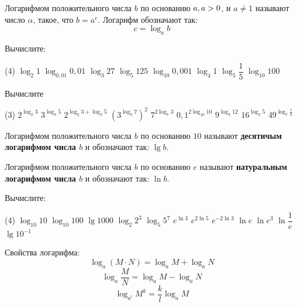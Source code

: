 \begin{class}[number=5]
	\begin{definit}
		Логарифмом положительного числа \(b\) по основанию \(a, \\ a>0 \), и \(a \neq 1\) называют число \( \alpha \), такое, что \(b=a^{c}\). Логарифм обозначают так: \[ c = \log_a b \]
	\end{definit}
	\begin{listofex}
		\item Вычислите:
		\begin{tasks}(4)
			\task \( \log_2 1 \)
			\task \( \log_{0,01} 0,01 \)
			\task \( \log_3 27 \)
			\task \( \log_5 125 \)
			\task \( \log_{10} 0,001 \)
			\task \( \log_4 1 \)
			\task \( \log_5 \dfrac{1}{5} \)
			\task \( \log_{10} 100 \)
		\end{tasks}
		\item Вычислите
		\begin{tasks}(3)
			\task \( 2^{\log_2 3} \)
			\task \( 3^{\log_3 5} \)
			\task \( 2^{\log_2 3 + \log_2 5} \)
			\task \( ( 3^{\log_3 7} )^2 \)
			\task \( 7^{2\log_7 3} \)
			\task \( 0,1^{2\log_{10} 10}  \)
			\task \( 9^{\log_3 12} \)
			\task \( 16^{\log_2 5} \)
			\task \( 49^{\log_7 \frac{1}{3}} \)
		\end{tasks}
	\end{listofex}
	\begin{definit}
		Логарифмом положительного числа \(b\) по основанию \(10\) называют \textbf{десятичым логарифмом числа \(b\)} и обозначают так: \( \lg b \).
	\end{definit}
	\begin{definit}
		Логарифмом положительного числа \(b\) по основанию \(e\) называют \textbf{натуральным логарифмом числа \(b\)} и обозначают так: \( \ln b \).
	\end{definit}
	\begin{listofex}[resume]
		\item Вычислите:
		\begin{tasks}(4)
			\task \( \log_{10} 10 \)
			\task \( \log_{10} 100 \)
			\task \( \lg 1000 \)
			\task \( \log_2 2^3 \)
			\task \( \log_5 5^7 \)
			\task \( e^{\ln 3} \)
			\task \( e^{2\ln 5} \)
			\task \( e^{-2\ln 3} \)
			\task \( \ln e \)
			\task \( \ln e^3 \)
			\task \( \ln \dfrac{1}{e} \)
			\task \( \lg 10^{-1} \)
		\end{tasks}
	\end{listofex}
	\begin{definit}
		Свойства логарифма:
		\[ \log_a(M \cdot N) = \log_a M + \log_a N \]
		\[ \log_a \dfrac{M}{N} = \log_a M - \log_a N \]
		\[ \log_{a^l} M^k=\dfrac{k}{l}\log_a M \]
	\end{definit}
	\begin{listofex}[resume]
		

\end{listofex}
\end{class}
